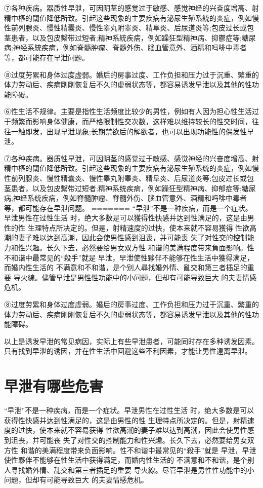 \documentclass[12pt,UTF8]{ctexbook}
\begin{document}
⑦各种疾病。器质性早泄，可因阴茎的感觉过于敏感、感觉神经的兴奋度增高、射精中樞的閾值降低所致。引起这些现象的主要疾病有泌尿生殖系統的炎症，例如慢性前列腺炎、慢性精囊炎、慢性睾丸附睾炎、精阜炎、后尿道炎等;包皮过长或包茎患者，以及包皮繫带过短者;精神系統疾病，例如躁狂型精神病、抑鬱症等;糖尿病;神经系統疾病，例如脊髓肿瘤、脊髓外伤、腦血管意外、酒精和吗啡中毒者等，都可能存在早泄问题。

⑧过度劳累和身体过度虚弱。婚后的房事过度、工作负担和压力过于沉重、繁重的体力劳动后、疾病剛剛恢复后不久的虚弱状态等，都容易诱发早泄以及其他的性功能障礙。

⑥性生活不规律。主要是指性生活频度比较少的男性，例如有人因为担心性生活过于频繁而影响身体健康，而严格限制性交次数，这样难以维持较长的性交时间，往往一触即发，出现早泄现象;长期禁欲后的解欲者，也可以出现功能性的偶发性早泄。

⑦各种疾病。器质性早泄，可因阴茎的感觉过于敏感、感觉神经的兴奋度增高、射精中樞的閾值降低所致。引起这些现象的主要疾病有泌尿生殖系统的炎症，例如慢性前列腺炎、慢性精囊炎、慢性睾丸附睾炎、精阜炎、后尿道炎等;包皮过长或包茎患者，以及包皮繫带过短者;精神系统疾病，例如躁狂型精神病、抑郁症等;糖尿病;神经系统疾病，例如脊髓肿瘤、脊髓外伤、腦血管意外、酒精和吗啡中毒者等，都可能存在早泄问题。
=======
“早泄”不是一种疾病，而是一个症状。早泄男性在过性生活
时，绝大多数是可以獲得性快感并达到性满足的，这是由男性的性
生理特点所决定的。但是，射精速度的过快，使本来就不容易獲得
性欲高潮的妻子难以达到高潮，因此会使男性感到沮喪，并可能喪
失了对性交的控制能力和性兴趣。长久下去，必然要给男女双方性
和谐的美满程度带来負面影响。性不和谐中最常见的“殺手”就是
早泄，早泄使性夥伴不能够在性生活中獲得满足，而婚内性生活的
不满意和不和谐，是个别人尋找婚外情、亂交和第三者插足的重要
导火線。儘管早泄是男性性功能中的小问题，但却有可能导致巨大
的夫妻情感危机。

⑧过度劳累和身体过度虚弱。婚后的房事过度、工作负担和压力过于沉重、繁重的体力劳动后、疾病刚刚恢复后不久的虚弱状态等，都容易诱发早泄以及其他的性功能障碍。

以上是诱发早泄的常见病因，实际上有些早泄患者，可能同时存在多种诱发因素。只有找到早泄的诱因，并在性生活中回避这些不利因素，才能让男性遠离早泄。

\section{早泄有哪些危害}

“早泄”不是一种疾病，而是一个症状。早泄男性在过性生活
时，绝大多数是可以获得性快感并达到性满足的，这是由男性的性
生理特点所决定的。但是，射精速度的过快，使本来就不容易获得
性欲高潮的妻子难以达到高潮，因此会使男性感到沮丧，并可能丧
失了对性交的控制能力和性兴趣。长久下去，必然要给男女双方性
和谐的美满程度带来负面影响。性不和谐中最常见的“殺手”就是
早泄，早泄使性夥伴不能够在性生活中获得满足，而婚内性生活的
不满意和不和谐，是个别人寻找婚外情、乱交和第三者插足的重要
导火線。尽管早泄是男性性功能中的小问题，但却有可能导致巨大
的夫妻情感危机。
\end{document}
